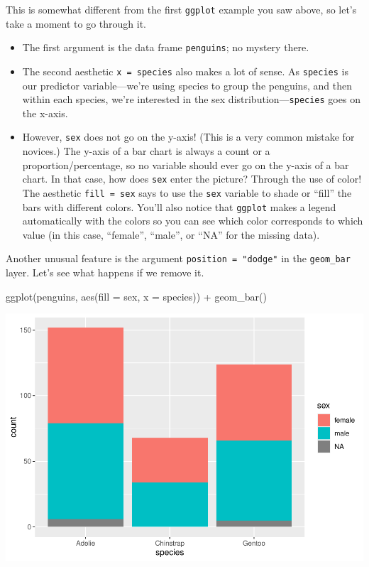 \documentclass[
]{book}
\newenvironment{Shaded}{\begin{snugshade}}{\end{snugshade}}
\newcommand{\AttributeTok}[1]{\textcolor[rgb]{0.77,0.63,0.00}{#1}}
\newcommand{\FunctionTok}[1]{\textcolor[rgb]{0.00,0.00,0.00}{#1}}
\newcommand{\NormalTok}[1]{#1}
\newcommand{\SpecialCharTok}[1]{\textcolor[rgb]{0.00,0.00,0.00}{#1}}
\providecommand{\tightlist}{%
  \setlength{\itemsep}{0pt}\setlength{\parskip}{0pt}}
\begin{document}
This is somewhat different from the first \texttt{ggplot} example you saw above, so let's take a moment to go through it.

\begin{itemize}
\tightlist
\item
  The first argument is the data frame \texttt{penguins}; no mystery there.
\item
  The second aesthetic \texttt{x\ =\ species} also makes a lot of sense. As \texttt{species} is our predictor variable---we're using species to group the penguins, and then within each species, we're interested in the sex distribution---\texttt{species} goes on the x-axis.
\item
  However, \texttt{sex} does not go on the y-axis! (This is a very common mistake for novices.) The y-axis of a bar chart is always a count or a proportion/percentage, so no variable should ever go on the y-axis of a bar chart. In that case, how does \texttt{sex} enter the picture? Through the use of color! The aesthetic \texttt{fill\ =\ sex} says to use the \texttt{sex} variable to shade or ``fill'' the bars with different colors. You'll also notice that \texttt{ggplot} makes a legend automatically with the colors so you can see which color corresponds to which value (in this case, ``female'', ``male'', or ``NA'' for the missing data).
\end{itemize}

Another unusual feature is the argument \texttt{position\ =\ "dodge"} in the \texttt{geom\_bar} layer. Let's see what happens if we remove it.

\begin{Shaded}
\begin{Highlighting}[]
\FunctionTok{ggplot}\NormalTok{(penguins, }\FunctionTok{aes}\NormalTok{(}\AttributeTok{fill =}\NormalTok{ sex, }\AttributeTok{x =}\NormalTok{ species)) }\SpecialCharTok{+} 
    \FunctionTok{geom\_bar}\NormalTok{()}
\end{Highlighting}
\end{Shaded}

\includegraphics{intro_stats_files/figure-latex/unnamed-chunk-62-1.pdf}
\end{document}
